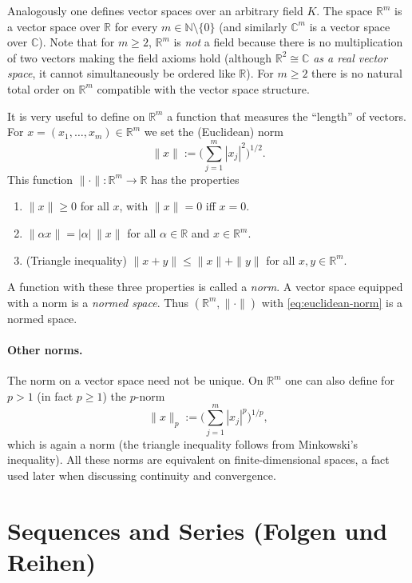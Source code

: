 \documentclass[12pt,a4paper]{article}
\newcommand{\N}{\mathbb{N}}
\newcommand{\R}{\mathbb{R}}
\newcommand{\C}{\mathbb{C}}
\theoremstyle{plain}
\theoremstyle{definition}
\theoremstyle{remark}
\begin{document}
Analogously one defines vector spaces over an arbitrary field $K$. The space $\R^m$ is a vector space over $\R$ for every $m\in\N\setminus\{0\}$ (and similarly $\C^m$ is a vector space over $\C$). Note that for $m\ge2$, $\R^m$ is \emph{not} a field because there is no multiplication of two vectors making the field axioms hold (although $\R^2\cong \C$ \emph{as a real vector space}, it cannot simultaneously be ordered like $\R$). For $m\ge2$ there is no natural total order on $\R^m$ compatible with the vector space structure.

It is very useful to define on $\R^m$ a function that measures the ``length'' of vectors. For $x=(x_1,\dots,x_m)\in\R^m$ we set the (Euclidean) norm
\begin{equation}\label{eq:euclidean-norm}\tag{2.6.1}
	\|x\| := \Bigg( \sum_{j=1}^m |x_j|^2 \Bigg)^{1/2}.
\end{equation}
This function $\|\cdot\| : \R^m\to \R$ has the properties
\begin{enumerate}[label=\roman*.), leftmargin=*]
	\item $\|x\| \ge 0$ for all $x$, with $\|x\|=0$ iff $x=0$.
	\item $\|\alpha x\| = |\alpha|\,\|x\|$ for all $\alpha\in\R$ and $x\in\R^m$.
	\item (Triangle inequality) $\|x+y\| \le \|x\| + \|y\|$ for all $x,y\in\R^m$.
\end{enumerate}
A function with these three properties is called a \emph{norm}. A vector space equipped with a norm is a \emph{normed space}. Thus $(\R^m,\|\cdot\|)$ with \eqref{eq:euclidean-norm} is a normed space.

\paragraph{Other norms.} The norm on a vector space need not be unique. On $\R^m$ one can also define for $p>1$ (in fact $p\ge 1$) the $p$-norm
\[
	\|x\|_p := \Bigg( \sum_{j=1}^m |x_j|^p \Bigg)^{1/p},
\]
which is again a norm (the triangle inequality follows from Minkowski's inequality). All these norms are equivalent on finite-dimensional spaces, a fact used later when discussing continuity and convergence.

\section{Sequences and Series (Folgen und Reihen)}
\end{document}
